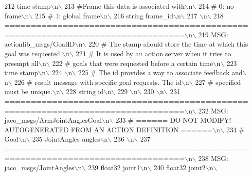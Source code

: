 \begin{DoxyCode}
212 \textcolor{stringliteral}{time stamp\(\backslash\)n\(\backslash\)}
213 \textcolor{stringliteral}{#Frame this data is associated with\(\backslash\)n\(\backslash\)}
214 \textcolor{stringliteral}{# 0: no frame\(\backslash\)n\(\backslash\)}
215 \textcolor{stringliteral}{# 1: global frame\(\backslash\)n\(\backslash\)}
216 \textcolor{stringliteral}{string frame\_id\(\backslash\)n\(\backslash\)}
217 \textcolor{stringliteral}{\(\backslash\)n\(\backslash\)}
218 \textcolor{stringliteral}{================================================================================\(\backslash\)n\(\backslash\)}
219 \textcolor{stringliteral}{MSG: actionlib\_msgs/GoalID\(\backslash\)n\(\backslash\)}
220 \textcolor{stringliteral}{# The stamp should store the time at which this goal was requested.\(\backslash\)n\(\backslash\)}
221 \textcolor{stringliteral}{# It is used by an action server when it tries to preempt all\(\backslash\)n\(\backslash\)}
222 \textcolor{stringliteral}{# goals that were requested before a certain time\(\backslash\)n\(\backslash\)}
223 \textcolor{stringliteral}{time stamp\(\backslash\)n\(\backslash\)}
224 \textcolor{stringliteral}{\(\backslash\)n\(\backslash\)}
225 \textcolor{stringliteral}{# The id provides a way to associate feedback and\(\backslash\)n\(\backslash\)}
226 \textcolor{stringliteral}{# result message with specific goal requests. The id\(\backslash\)n\(\backslash\)}
227 \textcolor{stringliteral}{# specified must be unique.\(\backslash\)n\(\backslash\)}
228 \textcolor{stringliteral}{string id\(\backslash\)n\(\backslash\)}
229 \textcolor{stringliteral}{\(\backslash\)n\(\backslash\)}
230 \textcolor{stringliteral}{\(\backslash\)n\(\backslash\)}
231 \textcolor{stringliteral}{================================================================================\(\backslash\)n\(\backslash\)}
232 \textcolor{stringliteral}{MSG: jaco\_msgs/ArmJointAnglesGoal\(\backslash\)n\(\backslash\)}
233 \textcolor{stringliteral}{# ====== DO NOT MODIFY! AUTOGENERATED FROM AN ACTION DEFINITION ======\(\backslash\)n\(\backslash\)}
234 \textcolor{stringliteral}{# Goal\(\backslash\)n\(\backslash\)}
235 \textcolor{stringliteral}{JointAngles angles\(\backslash\)n\(\backslash\)}
236 \textcolor{stringliteral}{\(\backslash\)n\(\backslash\)}
237 \textcolor{stringliteral}{================================================================================\(\backslash\)n\(\backslash\)}
238 \textcolor{stringliteral}{MSG: jaco\_msgs/JointAngles\(\backslash\)n\(\backslash\)}
239 \textcolor{stringliteral}{float32 joint1\(\backslash\)n\(\backslash\)}
240 \textcolor{stringliteral}{float32 joint2\(\backslash\)n\(\backslash\)}

\end{DoxyCode}
